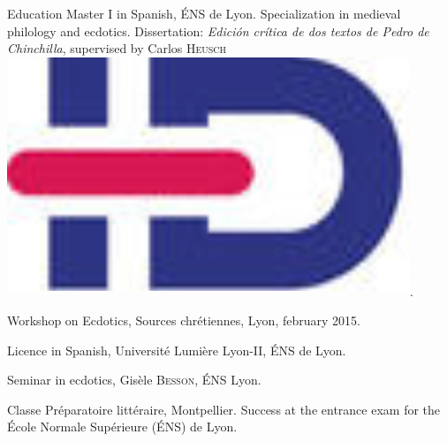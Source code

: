 \begin{rubric}{Education}
                                \entry*[2014-2015]
                            Master I in Spanish, ÉNS de Lyon. Specialization in medieval philology and
                        ecdotics. Dissertation: \textit{Edición crítica de dos textos de Pedro de
                            Chinchilla}, supervised by Carlos
                                \textsc{Heusch}\href{https://www.idref.fr/055838413}{\textsuperscript{\includegraphics[scale=0.025]{img/idref.png}}}.
                    
                                \entry*
                            Workshop on Ecdotics, Sources chrétiennes, Lyon, february 2015.
                    
                                \entry*[2013-2014]
                            Licence in Spanish, Université Lumière Lyon-II, ÉNS de Lyon.
                    
                                \entry*
                            Seminar in ecdotics, Gisèle \textsc{Besson}, ÉNS
                        Lyon.
                    
                                \entry*[2011-2013]
                            Classe Préparatoire littéraire, Montpellier. Success at the entrance exam
                        for the École Normale Supérieure (ÉNS) de Lyon.
                    \end{rubric}





